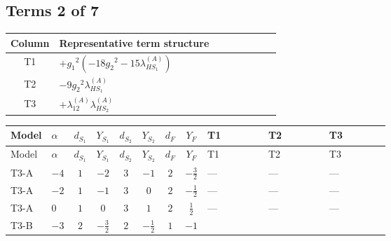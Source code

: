 \documentclass[8pt]{article}
\begin{document}
\begin{landscape}
\subsection*{Terms 2 of 7}
\begin{center}
\begin{tabular}{@{}c >{\raggedright\arraybackslash}p{0.82\linewidth}@{}}
\toprule
Column & Representative term structure \\
\midrule
T1 & \(\displaystyle +{g_1}^2 \left(-18 {g_2}^2-15 {\lambda_{HS_1}^{(A)}}\right)\) \\
\midrule
T2 & \(\displaystyle -9 {g_2}^2 {\lambda_{HS_1}^{(A)}}\) \\
\midrule
T3 & \(\displaystyle +{\lambda_{12}^{(A)}} {\lambda_{HS_2}^{(A)}}\) \\
\midrule
\bottomrule
\end{tabular}
\end{center}
\smallskip
\tiny
\begin{longtable}{@{}llcccccc >{\raggedright\arraybackslash}p{0.21\linewidth} >{\raggedright\arraybackslash}p{0.21\linewidth} >{\raggedright\arraybackslash}p{0.21\linewidth}@{}}
\toprule
Model & $\alpha$ & $d_{S_1}$ & $Y_{S_1}$ & $d_{S_2}$ & $Y_{S_2}$ & $d_F$ & $Y_F$ & T1 & T2 & T3 \\
\midrule
\endfirsthead
\toprule
Model & $\alpha$ & $d_{S_1}$ & $Y_{S_1}$ & $d_{S_2}$ & $Y_{S_2}$ & $d_F$ & $Y_F$ & T1 & T2 & T3 \\
\midrule
\endhead
T3-A & $-4$ & $1$ & $-2$ & $3$ & $-1$ & $2$ & $-\frac{3}{2}$ & --- & --- & --- \\
\midrule
T3-A & $-2$ & $1$ & $-1$ & $3$ & $0$ & $2$ & $-\frac{1}{2}$ & --- & --- & --- \\
\midrule
T3-A & $0$ & $1$ & $0$ & $3$ & $1$ & $2$ & $\frac{1}{2}$ & --- & --- & --- \\
\midrule
T3-B & $-3$ & $2$ & $-\frac{3}{2}$ & $2$ & $-\frac{1}{2}$ & $1$ & $-1$ & \scriptsize\adjustbox{max width=\linewidth}{$\begin{gathered} +{g_1}^2 \left(-18 {g_2}^2-15 {\lambda_{HS_1}^{(A)}}\right)\end{gathered}$} & \scriptsize\adjustbox{max width=\linewidth}{$\begin{gathered} -9 {g_2}^2 {\lambda_{HS_1}^{(A)}}\end{gathered}$} & \scriptsize\adjustbox{max width=\linewidth}{$\begin{gathered} +{\lambda_{12}^{(A)}} {\lambda_{HS_2}^{(A)}}\end{gathered}$} \\

\end{longtable}
\end{landscape}
\end{document}
